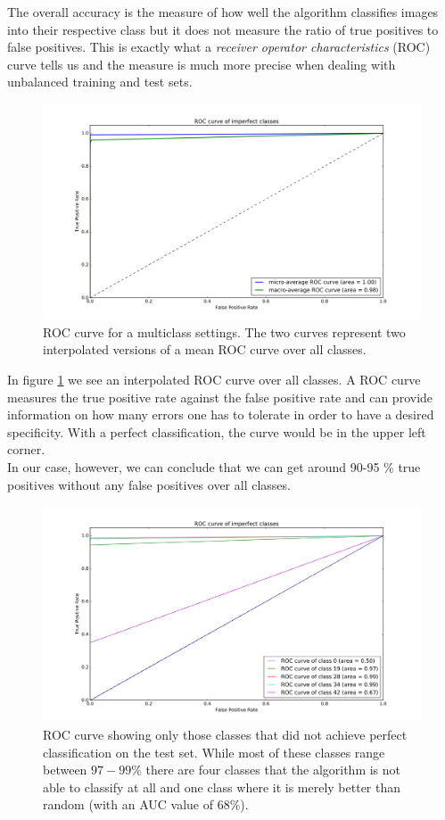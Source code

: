 \documentclass[11pt,a4paper]{article}
\begin{document}
The overall accuracy is the measure of how well the algorithm classifies images into their respective class but it does not measure the ratio of true positives to false positives. This is exactly what a \textit{receiver operator characteristics} (ROC) curve tells us and the measure is much more precise when dealing with unbalanced training and test sets.
\begin{figure}[h!]
	\includegraphics[width=\textwidth]{roc_multi.png}
	\centering
	\caption[Average ROC Curve]{ROC curve for a multiclass settings. The two curves represent two interpolated versions of a mean ROC curve over all classes.}
	\label{fig:roc_avg}
\end{figure}

In figure \ref{fig:roc_avg} we see an interpolated ROC curve over all classes. A ROC curve measures the true positive rate against the false positive rate and can provide information on how many errors one has to tolerate in order to have a desired specificity. With a perfect classification, the curve would be in the upper left corner.\\
In our case, however, we can conclude that we can get around 90-95 \% true positives without any false positives over all classes.
\begin{figure}[h!]
	\includegraphics[width=\textwidth]{roc_imperfect.png}
	\centering
	\caption[ROC Curve for imperfect classes]{ROC curve showing only those classes that did not achieve perfect classification on the test set. While most of these classes range between $97 - 99 \%$ there are four classes that the algorithm is not able to classify at all and one class where it is merely better than random (with an AUC value of $68\%$).}
	\label{fig:roc_imp}
\end{figure}
\end{document}
